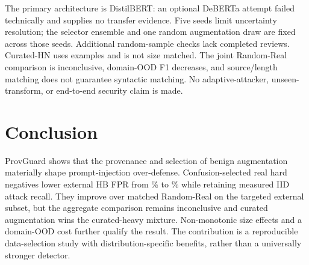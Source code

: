 \documentclass[conference]{IEEEtran}
\begin{document}
The primary architecture is DistilBERT: an optional DeBERTa attempt failed technically and supplies no transfer evidence. Five seeds limit uncertainty resolution; the selector ensemble and one random augmentation draw are fixed across those seeds. Additional random-sample checks lack completed reviews. Curated-HN uses \NCurAug{} examples and is not size matched. The joint Random-Real comparison is inconclusive, domain-OOD F1 decreases, and source/length matching does not guarantee syntactic matching. No adaptive-attacker, unseen-transform, or end-to-end security claim is made.

\section{Conclusion}
ProvGuard shows that the provenance and selection of benign augmentation materially shape prompt-injection over-defense. Confusion-selected real hard negatives lower external HB FPR from \BaseExtPct\% to \PGExtPct\% while retaining measured IID attack recall. They improve over matched Random-Real on the targeted external subset, but the aggregate comparison remains inconclusive and curated augmentation wins the curated-heavy mixture. Non-monotonic size effects and a domain-OOD cost further qualify the result. The contribution is a reproducible data-selection study with distribution-specific benefits, rather than a universally stronger detector.



\end{document}
